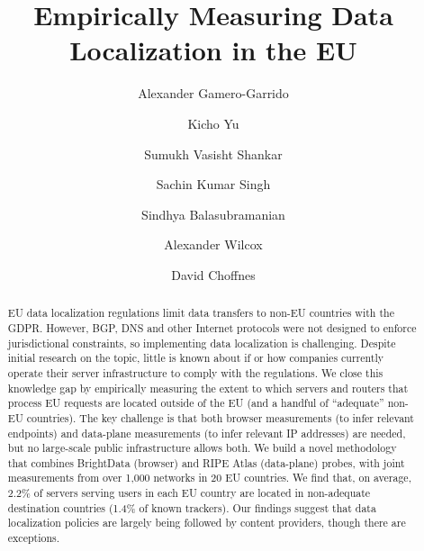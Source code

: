 \documentclass[sigconf,balance=false]{acmart}
\begin{document}
\author{Alexander Gamero-Garrido}

\author{Kicho Yu}

\author{Sumukh Vasisht Shankar}

\author{Sachin Kumar Singh}

\author{Sindhya Balasubramanian}

\author{Alexander Wilcox}

\author{David Choffnes}








  \title{Empirically Measuring Data Localization in the EU}



\begin{abstract}EU data localization regulations limit data transfers to non-EU countries with the GDPR. However, BGP, DNS and other Internet protocols were not designed to enforce jurisdictional constraints, so implementing data localization is challenging. 
Despite initial research on the topic, 
little is known about if or how companies currently operate their server infrastructure to comply with the regulations.
We close this knowledge gap by empirically measuring the extent 
to which servers and routers that process EU requests are located 
outside of the EU (and a handful of ``adequate'' non-EU countries). 
The key challenge is that both browser measurements (to infer relevant endpoints) 
and data-plane measurements (to infer relevant IP addresses) are needed, 
but no large-scale public infrastructure allows both. We build a novel methodology 
that combines BrightData (browser) and RIPE Atlas (data-plane) probes,
 with joint measurements from over 1,000 networks in 20 EU countries.
We find that, on average, 2.2\% of servers %
serving users in each EU country are located in non-adequate destination countries (1.4\% of known trackers). 
Our findings
suggest that data localization policies are largely being followed
by content providers, though there are %
exceptions. %
\end{abstract}
\end{document}
